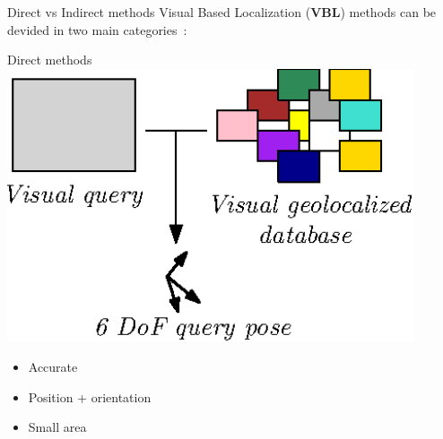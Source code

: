 \begin{frame}{Direct vs Indirect methods}
	Visual Based Localization (\textbf{VBL}) methods can be devided in two main categories~\cite{Piasco2017}:
	\vfill
	\begin{minipage}[t]{0.48\linewidth}
		\begin{block}{Direct methods}
			\includegraphics[width=0.9\textwidth]{vect/direct.eps}
			\begin{itemize}
				\item Accurate
				\item Position + orientation
				\item Small area
			\end{itemize}
		\end{block}
	\end{minipage}
	\hfill
\end{frame}

